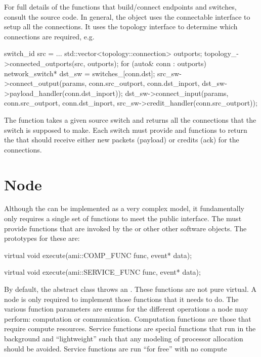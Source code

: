 For full details of the functions that build/connect endpoints and switches, consult the source code.
In general, the  object uses the connectable interface to setup all the connections.
It uses the topology interface to determine which connections are required, e.g.

\begin{CppCode}
switch_id src = ...
std::vector<topology::connection> outports;
topology_->connected_outports(src, outports);
for (auto& conn : outports){
  network_switch* dst_sw = switches_[conn.dst];
  src_sw->connect_output(params, conn.src_outport, conn.dst_inport,
  					 dst_sw->payload_handler(conn.dst_inport));
  dst_sw->connect_input(params, conn.src_outport, conn.dst_inport,
  				       src_sw->credit_handler(conn.src_outport));
}
\end{CppCode}
The  function takes a given source switch and returns all the connections that the
switch is supposed to make.  Each switch must provide  and  functions to return
the  that should receive either new packets (payload) or credits (ack) for the connections.

\section{Node}\label{sec:node}
Although the \nodecls can be implemented as a very complex model, it fundamentally only requires a single set of functions to meet the public interface.
The \nodecls must provide  functions that are invoked by the  or other other software objects.
The prototypes for these are:

\begin{CppCode}
virtual void execute(ami::COMP_FUNC func, event* data);

virtual void execute(ami::SERVICE_FUNC func, event* data);
\end{CppCode}	

By default, the abstract \nodecls class throws an . These functions are not pure virtual.
A node is only required to implement those functions that it needs to do.
The various function parameters are enums for the different operations a node may perform:
computation or communication. Computation functions are those that require compute resources. Service functions are special functions that run in the background and ``lightweight'' such that any modeling of processor allocation should be avoided. Service functions are run ``for free'' with no compute 

